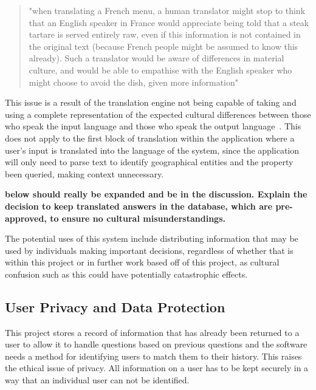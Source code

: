 \documentclass[authoryearcitations]{UoYCSproject}
\begin{document}
\blockquote{"when translating a French menu, a human translator might stop to think that an English speaker in France would appreciate being told that a steak tartare is served entirely raw, even if this information is not contained in the original text (because French people might be assumed to know this already). Such a translator would be aware of differences in material culture, and would be able to empathise with the English speaker who might choose to avoid the dish, given more information"~\cite{melby2006can, kenny2011ethics}}

This issue is a result of the translation engine not being capable of taking and using a complete representation of the expected cultural differences between those who speak the input language and those who speak the output language~\cite{melby2006can}. This does not apply to the first block of translation within the application where a user's input is translated into the language of the system, since the application will only need to parse text to identify geographical entities and the property been queried, making context unnecessary.

{\bf below should really be expanded and be in the discussion.  Explain the decision to keep translated answers in the database, which are pre-approved, to ensure no cultural misunderstandings.}

The potential uses of this system include distributing information that may be used by individuals making important decisions, regardless of whether that is within this project or in further work based off of this project, as cultural confusion such as this could have potentially catastrophic effects.

\subsection{User Privacy and Data Protection}
\label{subsubsec:userPrivacyAndDataProtection}
This project stores a record of information that has already been returned to a user to allow it to handle questions based on previous questions and the software needs a method for identifying users to match them to their history. This raises the ethical issue of privacy. All information on a user has to be kept securely in a way that an individual user can not be identified.
\end{document}
